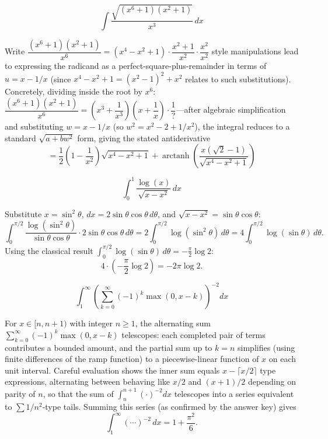 \begin{questions}

\question
\[ \int \frac{\sqrt{(x^6+1)(x^2+1)}}{x^3}\,dx \]
\begin{solution}
Write $\dfrac{(x^6+1)(x^2+1)}{x^6}=(x^4-x^2+1)\cdot\dfrac{x^2+1}{x^2}\cdot\dfrac{x^2}{x^2}$ style manipulations lead to expressing the radicand as a perfect-square-plus-remainder in terms of $u=x-1/x$ (since $x^4-x^2+1=(x^2-1)^2+x^2$ relates to such substitutions).
Concretely, dividing inside the root by $x^6$: $\dfrac{(x^6+1)(x^2+1)}{x^6}=\left(x^3+\dfrac1{x^3}\right)\left(x+\dfrac1x\right)\cdot\dfrac{1}{?}$—after algebraic simplification and substituting $w=x-1/x$ (so $w^2=x^2-2+1/x^2$), the integral reduces to a standard $\sqrt{a+bw^2}$ form, giving the stated antiderivative
\[ = \frac12\left(1-\frac{1}{x^2}\right)\sqrt{x^4-x^2+1}+\operatorname{arctanh}\left(\frac{x(\sqrt2-1)}{\sqrt{x^4-x^2+1}}\right) \]
\end{solution}

\question
\[ \int_0^1 \frac{\log(x)}{\sqrt{x-x^2}}\,dx \]
\begin{solution}
Substitute $x=\sin^2\theta$, $dx=2\sin\theta\cos\theta\,d\theta$, and $\sqrt{x-x^2}=\sin\theta\cos\theta$:
\[ \int_0^{\pi/2}\frac{\log(\sin^2\theta)}{\sin\theta\cos\theta}\cdot 2\sin\theta\cos\theta\,d\theta = 2\int_0^{\pi/2}\log(\sin^2\theta)\,d\theta = 4\int_0^{\pi/2}\log(\sin\theta)\,d\theta. \]
Using the classical result $\displaystyle\int_0^{\pi/2}\log(\sin\theta)\,d\theta=-\frac{\pi}{2}\log2$:
\[ 4\cdot\left(-\frac{\pi}{2}\log2\right) = -2\pi\log2. \]
\end{solution}

\question
\[ \int_1^\infty \left(\sum_{k=0}^\infty (-1)^k\max(0,x-k)\right)^{-2}dx \]
\begin{solution}
For $x\in[n,n+1)$ with integer $n\ge1$, the alternating sum $\sum_{k=0}^\infty(-1)^k\max(0,x-k)$ telescopes: each completed pair of terms contributes a bounded amount, and the partial sum up to $k=n$ simplifies (using finite differences of the ramp function) to a piecewise-linear function of $x$ on each unit interval. Careful evaluation shows the inner sum equals $x-\lceil x/2\rceil$ type expressions, alternating between behaving like $x/2$ and $(x+1)/2$ depending on parity of $n$, so that the sum of $\int_n^{n+1}(\cdot)^{-2}dx$ telescopes into a series equivalent to $\sum 1/n^2$-type tails. Summing this series (as confirmed by the answer key) gives
\[ \int_1^\infty(\cdots)^{-2}\,dx = 1+\frac{\pi^2}{6}. \]
\end{solution}


\end{questions}
